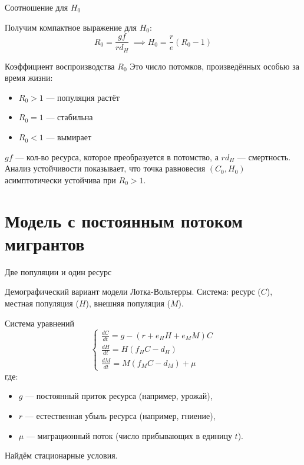\documentclass[12pt]{beamer}
\begin{document}
\begin{frame}{Соотношение для $H_0$}

Получим компактное выражение для $H_0$:
\[R_0 = \frac{g f}{r d_H}\ \implies H_0 = \frac{r}{e}(R_0 - 1)\]

\begin{exampleblock}{Коэффициент воспроизводства $R_0$}
Это число потомков, произведённых особью за время жизни:
\begin{itemize}
\item $R_0 > 1$ — популяция растёт
\item $R_0 = 1$ — стабильна
\item $R_0 < 1$ — вымирает
\end{itemize}
\end{exampleblock}

$gf$ — кол-во ресурса, которое преобразуется в потомство, а $rd_H$ — смертность. Анализ устойчивости показывает, что точка равновесия $(C_0, H_0)$ асимптотически устойчива при $R_0 > 1$.

\end{frame}

\section{Модель с постоянным потоком мигрантов}

\begin{frame}{Две популяции и один ресурс}

Демографический вариант модели Лотка-Вольтерры. Система: ресурс ($C$), местная популяция ($H$), внешняя популяция ($M$).

\begin{block}{Система уравнений}
\[
\begin{cases}
\frac{dC}{dt} = g - (r + e_H H + e_M M)C \\[12pt]
\frac{dH}{dt} = H(f_H C - d_H) \\[12pt]
\frac{dM}{dt} = M(f_M C - d_M) + \mu
\end{cases}
\]
где:
\begin{itemize}
    \item $g$ — постоянный приток ресурса (например, урожай),
    \item $r$ — естественная убыль ресурса (например, гниение),
    \item $\mu$ — миграционный поток (число прибывающих в единицу $t$).
\end{itemize}
\end{block}

Найдём стационарные условия.

\end{frame}
\end{document}

